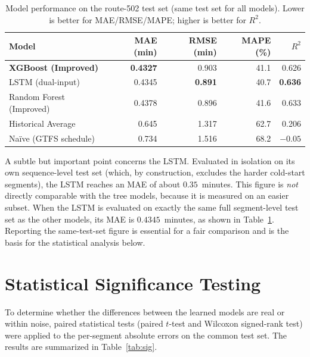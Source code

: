 \begin{table}[!htbp]
    \centering
    \caption{\label{tab:overall}Model performance on the route-502 test set (same test set for all models). Lower is better for MAE/RMSE/MAPE; higher is better for $R^2$.}
    \begin{tabular}{@{}lrrrr@{}}
        \toprule
        \textbf{Model} & \textbf{MAE (min)} & \textbf{RMSE (min)} & \textbf{MAPE (\%)} & \textbf{$R^2$} \\
        \midrule
        \textbf{XGBoost (Improved)} & \textbf{0.4327} & 0.903 & 41.1 & 0.626 \\
        LSTM (dual-input)          & 0.4345 & \textbf{0.891} & 40.7 & \textbf{0.636} \\
        Random Forest (Improved)   & 0.4378 & 0.896 & 41.6 & 0.633 \\
        Historical Average         & 0.645  & 1.317 & 62.7 & 0.206 \\
        Naïve (GTFS schedule)      & 0.734  & 1.516 & 68.2 & $-0.05$ \\
        \bottomrule
    \end{tabular}
\end{table}

A subtle but important point concerns the LSTM. Evaluated in isolation on its own sequence-level test set (which, by construction, excludes the harder cold-start segments), the LSTM reaches an MAE of about $0.35$~minutes. This figure is \emph{not} directly comparable with the tree models, because it is measured on an easier subset. When the LSTM is evaluated on exactly the same full segment-level test set as the other models, its MAE is $0.4345$~minutes, as shown in Table~\ref{tab:overall}. Reporting the same-test-set figure is essential for a fair comparison and is the basis for the statistical analysis below.

\section{Statistical Significance Testing}

To determine whether the differences between the learned models are real or within noise, paired statistical tests (paired $t$-test and Wilcoxon signed-rank test) were applied to the per-segment absolute errors on the common test set. The results are summarized in Table~\ref{tab:sig}.

